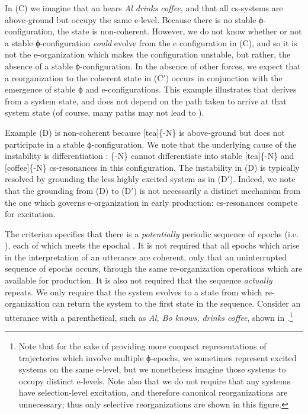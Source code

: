   In (C) we imagine that an  hears \textit{Al drinks coffee}, and that all cs-systems are above-ground but occupy the same e-level. Because there is no stable ϕ-configuration, the state is non-coherent. However, we do not know whether or not a stable ϕ-configuration \textit{could} evolve from the e configuration in (C), and so it is not the e-organization which makes the configuration unstable, but rather, the absence of a stable ϕ-configuration. In the absence of other forces, we expect that a reorganization to the coherent state in (C$'$) occurs in conjunction with the emergence of stable ϕ and e-configurations. This example illustrates that  derives from a system state, and does not depend on the path taken to arrive at that system state (of course, many paths may not lead to ). 

  Example (D) is non-coherent because [tea]\{-N\} is above-ground but does not participate in a stable ϕ-configuration. We note that the underlying cause of the instability is differentiation : \{-N\} cannot differentiate into stable [tea]\{-N\} and [coffee]\{-N\} cs-resonances in this configuration. The instability in (D) is typically resolved by grounding the less highly excited system as in (D$'$). Indeed, we note that the grounding from (D) to (D$'$) is not necessarily a distinct mechanism from the one which governs e-organization in early production: cs-resonances compete for excitation.

The  criterion specifies that there is a \textit{potentially} periodic sequence of epochs (i.e. ), each of which meets the epochal . It is not required that all epochs which arise in the interpretation of an utterance are coherent, only that an uninterrupted sequence of epochs occurs, through the same re-organization operations which are available for production. It is also not required that the sequence \textit{actually} repeats. We only require that the  system evolves to a state from which re-organization can return the system to the first state in the sequence. Consider an utterance with a parenthetical, such as \textit{Al, Bo knows, drinks coffee}, shown in {}.\footnote{Note that for the sake of providing more compact representations of trajectories which involve multiple ϕ-epochs, we sometimes represent excited systems on the same e-level, but we nonetheless imagine those systems to occupy distinct e-levels. Note also that we do not require that any systems have selection-level excitation, and therefore canonical reorganizations are unnecessary; thus only selective reorganizations are shown in this figure.}

